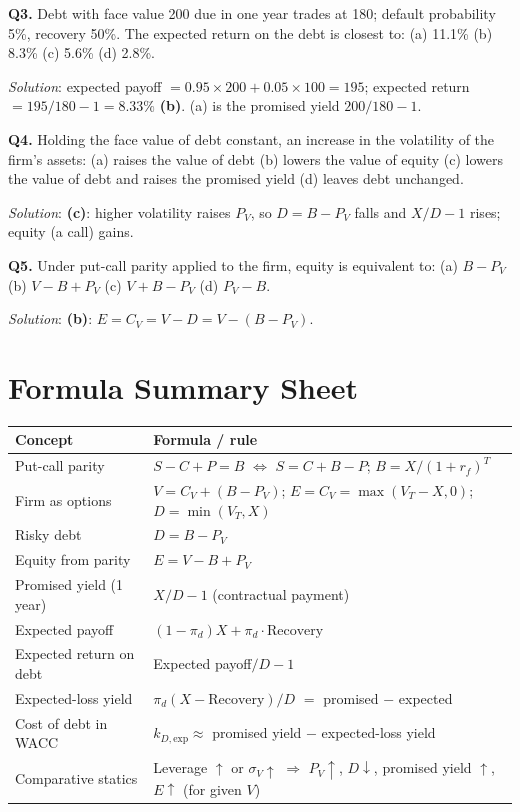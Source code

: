 \begin{exbox}
\textbf{Q3.} Debt with face value 200 due in one year trades at 180; default probability 5\%, recovery 50\%. The expected return on the debt is closest to: (a) 11.1\% (b) 8.3\% (c) 5.6\% (d) 2.8\%.

\emph{Solution}: expected payoff $=0.95\times200+0.05\times100=195$; expected return $=195/180-1=8.33\%$ \textbf{(b)}. (a) is the promised yield $200/180-1$.

\textbf{Q4.} Holding the face value of debt constant, an increase in the volatility of the firm's assets: (a) raises the value of debt (b) lowers the value of equity (c) lowers the value of debt and raises the promised yield (d) leaves debt unchanged.

\emph{Solution}: \textbf{(c)}: higher volatility raises $P_V$, so $D=B-P_V$ falls and $X/D-1$ rises; equity (a call) gains.

\textbf{Q5.} Under put-call parity applied to the firm, equity is equivalent to: (a) $B-P_V$ (b) $V-B+P_V$ (c) $V+B-P_V$ (d) $P_V-B$.

\emph{Solution}: \textbf{(b)}: $E=C_V=V-D=V-(B-P_V)$.
\end{exbox}

\section{Formula Summary Sheet}
\begin{center}
\small
\renewcommand{\arraystretch}{1.5}
\begin{tabular}{@{}p{5cm}p{10cm}@{}}
\toprule
\textbf{Concept} & \textbf{Formula / rule}\\
\midrule
Put-call parity & $S-C+P=B$ $\iff$ $S=C+B-P$; $B=X/(1+r_f)^T$\\
Firm as options & $V=C_V+(B-P_V)$; $E=C_V=\max(V_T-X,0)$; $D=\min(V_T,X)$\\
Risky debt & $D=B-P_V$\\
Equity from parity & $E=V-B+P_V$\\
Promised yield (1 year) & $X/D-1$ (contractual payment)\\
Expected payoff & $(1-\pi_d)X+\pi_d\cdot\text{Recovery}$\\
Expected return on debt & Expected payoff$/D-1$\\
Expected-loss yield & $\pi_d(X-\text{Recovery})/D$ $=$ promised $-$ expected\\
Cost of debt in WACC & $k_{D,\text{exp}}\approx$ promised yield $-$ expected-loss yield\\
Comparative statics & Leverage $\uparrow$ or $\sigma_V\uparrow$ $\Rightarrow$ $P_V\uparrow$, $D\downarrow$, promised yield $\uparrow$, $E\uparrow$ (for given $V$)\\
\bottomrule
\end{tabular}
\end{center}

